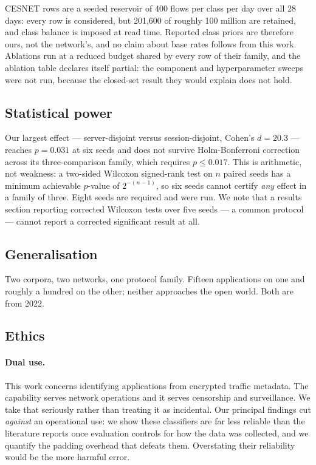 CESNET rows are a seeded reservoir of 400 flows per class per day over all 28
days: every row is considered, but 201{,}600 of roughly 100 million are
retained, and class balance is imposed at read time. Reported class priors are
therefore ours, not the network's, and no claim about base rates follows from
this work. Ablations run at a reduced budget shared by every row of their
family, and the ablation table declares itself partial: the component and
hyperparameter sweeps were not run, because the closed-set result they would
explain does not hold.

\subsection{Statistical power}

Our largest effect --- server-disjoint versus session-disjoint, Cohen's
$d = 20.3$ --- reaches $p = 0.031$ at six seeds and does not survive
Holm-Bonferroni correction across its three-comparison family, which requires
$p \le 0.017$. This is arithmetic, not weakness: a two-sided Wilcoxon
signed-rank test on $n$ paired seeds has a minimum achievable $p$-value of
$2^{-(n-1)}$, so six seeds cannot certify \emph{any} effect in a family of
three. Eight seeds are required and were run. We note that a results section
reporting corrected Wilcoxon tests over five seeds --- a common protocol ---
cannot report a corrected significant result at all.

\subsection{Generalisation}

Two corpora, two networks, one protocol family. Fifteen applications on one and
roughly a hundred on the other; neither approaches the open world. Both are
from 2022.

\subsection{Ethics}

\paragraph{Dual use.} This work concerns identifying applications from
encrypted traffic metadata. The capability serves network operations and it
serves censorship and surveillance. We take that seriously rather than treating
it as incidental. Our principal findings cut \emph{against} an operational use:
we show these classifiers are far less reliable than the literature reports
once evaluation controls for how the data was collected, and we quantify the
padding overhead that defeats them. Overstating their reliability would be the
more harmful error.

